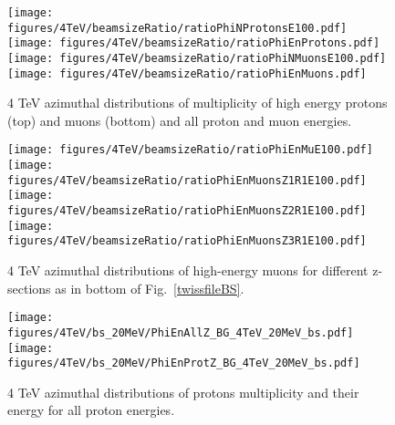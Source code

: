 \begin{figure}[!htb]
\begin{center}
  \texttt{[image: figures/4TeV/beamsizeRatio/ratioPhiNProtonsE100.pdf]}
  \texttt{[image: figures/4TeV/beamsizeRatio/ratioPhiEnProtons.pdf]}
  \texttt{[image: figures/4TeV/beamsizeRatio/ratioPhiNMuonsE100.pdf]}
  \texttt{[image: figures/4TeV/beamsizeRatio/ratioPhiEnMuons.pdf]}
\end{center}
\vspace{-0.6cm}
 \caption{4 TeV azimuthal distributions of multiplicity of high energy protons (top) and muons (bottom) and all proton and muon energies.
  \label{bsRatioPhiMP}}
\end{figure}


\begin{figure}[!htb]
\begin{center}
  \texttt{[image: figures/4TeV/beamsizeRatio/ratioPhiEnMuE100.pdf]}
  \texttt{[image: figures/4TeV/beamsizeRatio/ratioPhiEnMuonsZ1R1E100.pdf]}
  \texttt{[image: figures/4TeV/beamsizeRatio/ratioPhiEnMuonsZ2R1E100.pdf]}
  \texttt{[image: figures/4TeV/beamsizeRatio/ratioPhiEnMuonsZ3R1E100.pdf]}
\end{center}
\vspace{-0.6cm}
 \caption{4 TeV azimuthal distributions of high-energy muons for different z-sections as in bottom of Fig.~\ref{twissfileBS}.
  \label{bsRatioPhiEnMu}}
\end{figure}

\begin{figure}[!htb]
\begin{center}
  \texttt{[image: figures/4TeV/bs\_20MeV/PhiEnAllZ\_BG\_4TeV\_20MeV\_bs.pdf]}
  \texttt{[image: figures/4TeV/bs\_20MeV/PhiEnProtZ\_BG\_4TeV\_20MeV\_bs.pdf]}
\end{center}
\vspace{-0.6cm}
 \caption{4 TeV azimuthal distributions of protons multiplicity and their energy for all proton energies.
  \label{bsZ}}
\end{figure}

